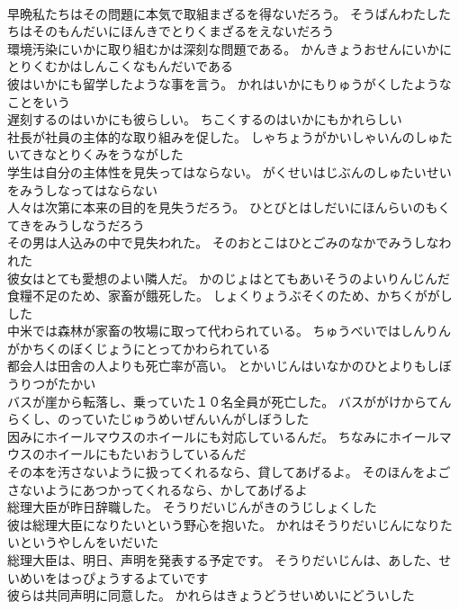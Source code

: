 \documentclass[8pt]{extreport}
\begin{document}
\begin{CJK}{UTF8}{min}
\\	早晩私たちはその問題に本気で取組まざるを得ないだろう。	そうばんわたしたちはそのもんだいにほんきでとりくまざるをえないだろう 
\\	環境汚染にいかに取り組むかは深刻な問題である。	かんきょうおせんにいかにとりくむかはしんこくなもんだいである 
\\	彼はいかにも留学したような事を言う。	かれはいかにもりゅうがくしたようなことをいう 
\\	遅刻するのはいかにも彼らしい。	ちこくするのはいかにもかれらしい 
\\	社長が社員の主体的な取り組みを促した。	しゃちょうがかいしゃいんのしゅたいてきなとりくみをうながした 
\\	学生は自分の主体性を見失ってはならない。	がくせいはじぶんのしゅたいせいをみうしなってはならない 
\\	人々は次第に本来の目的を見失うだろう。	ひとびとはしだいにほんらいのもくてきをみうしなうだろう 
\\	その男は人込みの中で見失われた。	そのおとこはひとごみのなかでみうしなわれた 
\\	彼女はとても愛想のよい隣人だ。	かのじょはとてもあいそうのよいりんじんだ 
\\	食糧不足のため、家畜が餓死した。	しょくりょうぶそくのため、かちくががしした 
\\	中米では森林が家畜の牧場に取って代わられている。	ちゅうべいではしんりんがかちくのぼくじょうにとってかわられている 
\\	都会人は田舎の人よりも死亡率が高い。	とかいじんはいなかのひとよりもしぼうりつがたかい 
\\	バスが崖から転落し、乗っていた１０名全員が死亡した。	バスががけからてんらくし、のっていたじゅうめいぜんいんがしぼうした 
\\	因みにホイールマウスのホイールにも対応しているんだ。	ちなみにホイールマウスのホイールにもたいおうしているんだ 
\\	その本を汚さないように扱ってくれるなら、貸してあげるよ。	そのほんをよごさないようにあつかってくれるなら、かしてあげるよ 
\\	総理大臣が昨日辞職した。	そうりだいじんがきのうじしょくした 
\\	彼は総理大臣になりたいという野心を抱いた。	かれはそうりだいじんになりたいというやしんをいだいた 
\\	総理大臣は、明日、声明を発表する予定です。	そうりだいじんは、あした、せいめいをはっぴょうするよていです 
\\	彼らは共同声明に同意した。	かれらはきょうどうせいめいにどういした 

\end{CJK}
\end{document}
